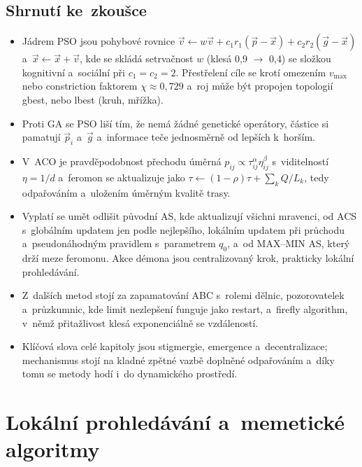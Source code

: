 \documentclass[11pt,a4paper]{article}
\theoremstyle{definition}
\begin{document}
\subsection{Shrnutí ke~zkoušce}

\begin{itemize}
\item Jádrem PSO jsou pohybové rovnice
  $\vec v \gets w\vec v + c_1r_1(\vec p - \vec x) + c_2r_2(\vec g - \vec x)$
  a~$\vec x \gets \vec x + \vec v$, kde se skládá setrvačnost $w$ (klesá 0{,}9 $\to$ 0{,}4)
  se složkou kognitivní a~sociální při $c_1=c_2=2$. Přestřelení cíle se krotí omezením
  $v_{\max}$ nebo constriction faktorem $\chi \approx 0{,}729$ a~roj může být propojen
  topologií gbest, nebo lbest (kruh, mřížka).
\item Proti GA se PSO liší tím, že nemá žádné genetické operátory, částice si pamatují
  $\vec p_i$ a~$\vec g$ a~informace teče jednosměrně od lepších k~horším.
\item V~ACO je pravděpodobnost přechodu úměrná
  $p_{ij} \propto \tau_{ij}^{\alpha}\eta_{ij}^{\beta}$ s~viditelností $\eta = 1/d$
  a~feromon se aktualizuje jako $\tau \gets (1-\rho)\tau + \sum_k Q/L_k$, tedy odpařováním
  a~uložením úměrným kvalitě trasy.
\item Vyplatí se umět odlišit původní AS, kde aktualizují všichni mravenci, od ACS
  s~globálním updatem jen podle nejlepšího, lokálním updatem při průchodu a~pseudonáhodným
  pravidlem s~parametrem $q_0$, a~od MAX--MIN AS, který drží meze feromonu. Akce démona jsou
  centralizovaný krok, prakticky lokální prohledávání.
\item Z~dalších metod stojí za zapamatování ABC s~rolemi dělnic, pozorovatelek
  a~průzkumnic, kde limit nezlepšení funguje jako restart, a~firefly algorithm, v~němž
  přitažlivost klesá exponenciálně se vzdáleností.
\item Klíčová slova celé kapitoly jsou stigmergie, emergence a~decentralizace; mechanismus
  stojí na kladné zpětné vazbě doplněné odpařováním a~díky tomu se metody hodí i~do
  dynamického prostředí.
\end{itemize}


\section{Lokální prohledávání a~memetické algoritmy}
\label{sec:lokalni}
\end{document}
